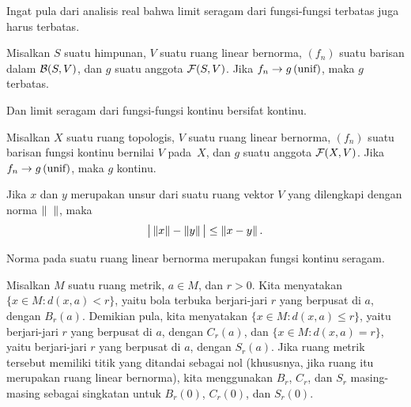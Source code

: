 Ingat pula dari analisis real bahwa limit seragam dari fungsi-fungsi terbatas juga harus
terbatas.

\begin{prop}\label{C023151} Misalkan $S$ suatu himpunan, $V$ suatu ruang linear bernorma,
$(f_n)$ suatu barisan dalam $\mathcal{B}(S,V)$, dan $g$ suatu anggota $\mathcal{F}(S,V)$. Jika
$f_n \rightarrow g\text{\,(unif)}$, maka $g$ terbatas.
\end{prop}

Dan limit seragam dari fungsi-fungsi kontinu bersifat kontinu.

\begin{prop}\label{C023154} Misalkan $X$ suatu ruang topologis, $V$ suatu ruang linear
bernorma, $(f_n)$ suatu barisan fungsi kontinu bernilai $V$ pada~$X$, dan $g$ suatu anggota
$\mathcal{F}(X,V)$. Jika $f_n \rightarrow g\text{\,(unif)}$, maka $g$ kontinu.
\end{prop}

\begin{prop}\label{C023163} Jika $x$ dan $y$ merupakan unsur dari suatu ruang vektor $V$
yang dilengkapi dengan norma $\lVert\hphantom{x}\rVert$, maka
  \[ \left\lvert\strut\,\lVert x\rVert - \lVert y\rVert\,\right\rvert \le \lVert x - y\rVert\,. \]
\end{prop}

\begin{cor} Norma pada suatu ruang linear bernorma merupakan fungsi kontinu seragam.
\end{cor}

\begin{notn} Misalkan $M$ suatu ruang metrik, $a \in M$, dan $r > 0$. Kita menyatakan
$\{x \in M\colon d(x,a) < r\}$, yaitu
bola terbuka berjari-jari $r$ yang berpusat di $a$, dengan $B_r(a)$. Demikian pula, kita
menyatakan $\{x \in M\colon d(x,a) \le r\}$, yaitu
 berjari-jari $r$ yang berpusat di $a$, dengan $C_r(a)$, dan
$\{x \in M\colon d(x,a) = r\}$, yaitu
 berjari-jari $r$ yang berpusat di $a$, dengan $S_r(a)$. Jika ruang metrik tersebut
memiliki titik yang ditandai sebagai nol (khususnya, jika ruang itu merupakan ruang linear bernorma), kita menggunakan
$B_r$, $C_r$, dan $S_r$ masing-masing sebagai singkatan untuk $B_r(0)$, $C_r(0)$, dan $S_r(0)$.
\end{notn}

